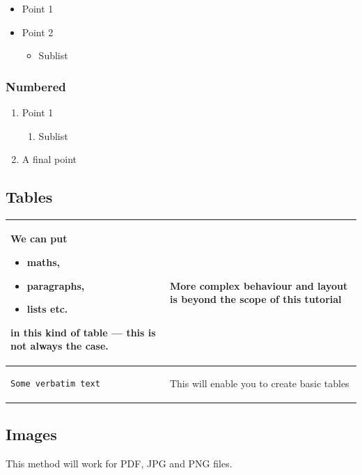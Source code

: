 \documentclass[a4paper,12pt]{extarticle}
\begin{document}
\begin{itemize}
\item Point 1
\item Point 2
\begin{itemize}
\item Sublist
\end{itemize}
\end{itemize}

\subsubsection{Numbered}

\begin{enumerate}
\item Point 1
\begin{enumerate}
\item Sublist
\end{enumerate}
\item A final point
\end{enumerate}

\subsection{Tables}

\begin{tabular}{|p{}|p{}|}
\hline
We can put \begin{itemize}
\item maths, \item paragraphs, \item lists etc. 
\end{itemize} in this kind of table --- this is not always the case. 
& \bigskip More complex behaviour and layout is beyond the scope of this tutorial \\
\hline
\begin{verbatim}
Some verbatim text
\end{verbatim}
& \begin{center}
This will enable you to create basic tables
\end{center}
\\
\hline
\end{tabular}

\subsection{Images}

This method will work for PDF, JPG and PNG files.
\end{document}
